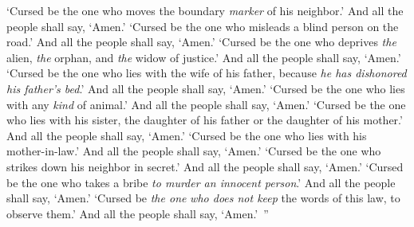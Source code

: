 \begin{biblechapter}
\verse ‘Cursed be the one who moves the boundary \textit{marker} of his neighbor.’ And all the people shall say, ‘Amen.’
\verse ‘Cursed be the one who misleads a blind person on the road.’ And all the people shall say, ‘Amen.’
\verse ‘Cursed be the one who deprives \textit{the} alien, \textit{the} orphan, and \textit{the} widow of justice.’ And all the people shall say, ‘Amen.’
\verse ‘Cursed be the one who lies with the wife of his father, because \textit{he has dishonored his father’s bed}.’ And all the people shall say, ‘Amen.’
\verse ‘Cursed be the one who lies with any \textit{kind} of animal.’ And all the people shall say, ‘Amen.’
\verse ‘Cursed be the one who lies with his sister, the daughter of his father or the daughter of his mother.’ And all the people shall say, ‘Amen.’
\verse ‘Cursed be the one who lies with his mother-in-law.’ And all the people shall say, ‘Amen.’
\verse ‘Cursed be the one who strikes down his neighbor in secret.’ And all the people shall say, ‘Amen.’
\verse ‘Cursed be the one who takes a bribe \textit{to murder an innocent person}.’ And all the people shall say, ‘Amen.’
\verse ‘Cursed be \textit{the one} \textit{who does not keep} the words of this law, to observe them.’ And all the people shall say, ‘Amen.’ ”
\end{biblechapter}


